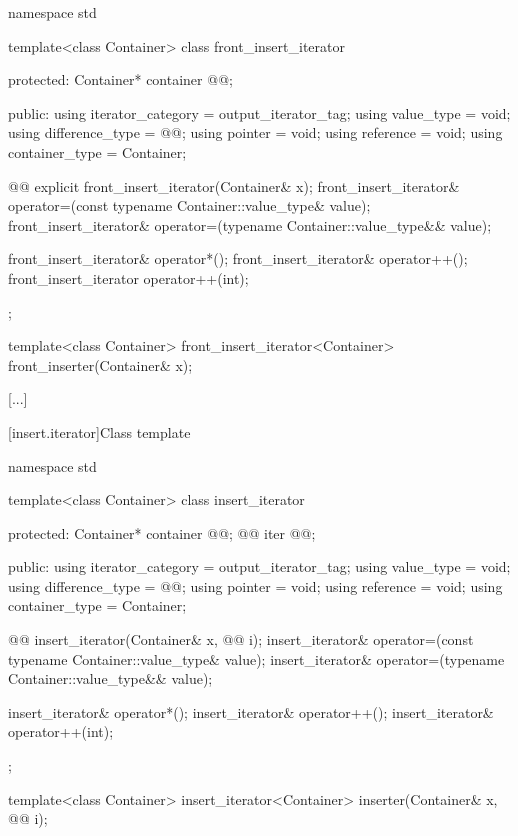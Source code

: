 %
\begin{codeblock}
namespace std {
  template<class Container>
  class front_insert_iterator {
  protected:
    Container* container @@;

  public:
    using iterator_category = output_iterator_tag;
    using value_type        = void;
    using difference_type   = @@;
    using pointer           = void;
    using reference         = void;
    using container_type    = Container;

    @@
    explicit front_insert_iterator(Container& x);
    front_insert_iterator& operator=(const typename Container::value_type& value);
    front_insert_iterator& operator=(typename Container::value_type&& value);

    front_insert_iterator& operator*();
    front_insert_iterator& operator++();
    front_insert_iterator  operator++(int);
  };

  template<class Container>
    front_insert_iterator<Container> front_inserter(Container& x);
}
\end{codeblock}

[...]

[insert.iterator]{Class template }


%
\begin{codeblock}
namespace std {
  template<class Container>
  class insert_iterator {
  protected:
    Container* container @@;
    @@ iter @\newtxt{\{\}}@;

  public:
    using iterator_category = output_iterator_tag;
    using value_type        = void;
    using difference_type   = @@;
    using pointer           = void;
    using reference         = void;
    using container_type    = Container;

    @@
    insert_iterator(Container& x, @@ i);
    insert_iterator& operator=(const typename Container::value_type& value);
    insert_iterator& operator=(typename Container::value_type&& value);

    insert_iterator& operator*();
    insert_iterator& operator++();
    insert_iterator& operator++(int);
  };

  template<class Container>
    insert_iterator<Container> inserter(Container& x, @@ i);
}
\end{codeblock}

